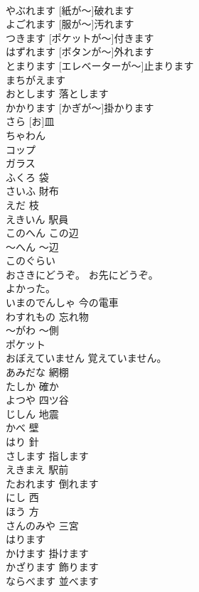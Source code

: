 \documentclass[8pt]{extreport}
\begin{document}
\begin{CJK}{UTF8}{min}
\\	[かみが～]やぶれます	[紙が～]破れます	
\\	[ふくが～]よごれます	[服が～]汚れます	
\\	[ポケットが～]つきます	[ポケットが～]付きます	
\\	[ボタンが～]はずれます	[ボタンが～]外れます	
\\	[エレベーターが～]とまります	[エレベーターが～]止まります	
\\	まちがえます			
\\	おとします	落とします	
\\	[かぎが～]かかります	[かぎが～]掛かります	
\\	[お]さら	[お]皿	
\\	[お]ちゃわん			
\\	コップ			
\\	ガラス			
\\	ふくろ	袋	
\\	さいふ	財布	
\\	えだ	枝	
\\	えきいん	駅員	
\\	このへん	この辺	
\\	～へん	～辺	
\\	このぐらい			
\\	おさきにどうぞ。	お先にどうぞ。	
\\	[ああ、]よかった。			
\\	いまのでんしゃ	今の電車	
\\	わすれもの	忘れ物	
\\	～がわ	～側	
\\	ポケット			
\\	おぼえていません	覚えていません。	
\\	あみだな	網棚	
\\	たしか	確か	
\\	よつや	四ツ谷	
\\	じしん	地震	
\\	かべ	壁	
\\	はり	針	
\\	さします	指します	
\\	えきまえ	駅前	
\\	たおれます	倒れます	
\\	にし	西	
\\	ほう	方	
\\	さんのみや	三宮	
\\	はります			
\\	かけます	掛けます	
\\	かざります	飾ります	
\\	ならべます	並べます	

\end{CJK}
\end{document}
